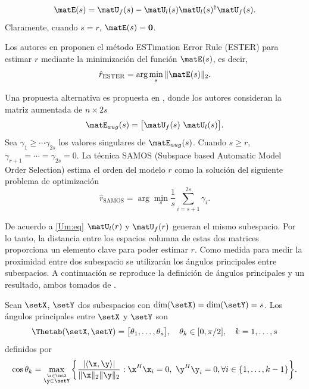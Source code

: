\begin{equation}
	\matE(s) = \matU_f(s) - \matU_l(s)\matU_l(s)^\dagger\matU_f(s).
	\label{eq:rhatESTER}
\end{equation}
Claramente, cuando $s=r$, $\matE(s)= \mathbf{0}$.

Los autores en \cite{Badeau2006} proponen el método ESTimation Error Rule (ESTER) para estimar $r$ mediante la minimización del función $\matE(s)$, es decir,
\begin{equation}
	\hat{r}_{\mathrm{ESTER}} = \arg\min_s\|\matE(s)\|_2.
	\label{Eq:ESTER_Rule}
\end{equation}

Una propuesta alternativa es propuesta en \cite{Papy2007}, donde los autores consideran la matriz aumentada de $n\times 2s$
\[ \matE_{aug}(s) = \big[\matU_f(s)\ \matU_l(s)\big].\]
Sea $\gamma_1\ge\cdots\gamma_{2s}$ los valores singulares de $\matE_{aug}(s)$. Cuando $s\ge r$, $\gamma_{r+1} = \cdots =\gamma_{2s} = 0$. La técnica SAMOS (Subspace based Automatic Model Order Selection) estima el orden del modelo $r$ como la solución del siguiente problema de optimización
\begin{equation}
	\hat{r}_{\mathrm{SAMOS}} = \arg\min_s\frac{1}{s}\sum_{i=s+1}^{2s} \gamma_i. 
	\label{eq:rhatSAMOS}
\end{equation}

De acuerdo a \eqref{Um:eq} $\matU_l(r)$ y $\matU_f(r)$ generan el mismo subespacio. Por lo tanto, la distancia entre los espacios columna de estas dos matrices proporciona un elemento clave para poder estimar $r$. Como medida para medir la proximidad entre dos subespacio se utilizarán los ángulos principales entre subespacios. A continuación se reproduce la definición de ángulos principales y un resultado, ambos tomados de \cite{Stewart1990}.

\begin{definition}\cite{Stewart1990}\label{def:principalAngles}
	Sean $\setX$, $\setY$ dos subespacios con $\dim(\setX) = \dim(\setY)=s$. Los ángulos principales entre $\setX$ y $\setY$ son
	\begin{equation*}
		\Thetab(\setX,\setY) = \big[\theta_1, \ldots, \theta_s\big],\quad \theta_k\in[0,\pi/2],\quad k=1,\ldots,s
	\end{equation*}
	definidos por
	\begin{equation}
		\cos\theta_k = \max_{\stackrel{\x\in\setX}{\y\in\setY}}\bigg\{\frac{|\langle\x,\y\rangle|}{\|\x\|_2\|\y\|_2} : \x^H\x_i = 0,\ \y^H\y_i = 0,  \forall i\in\{1,\ldots,k-1\}\bigg\}.
		\label{Eq:principalAngles2}
	\end{equation}
\end{definition}

